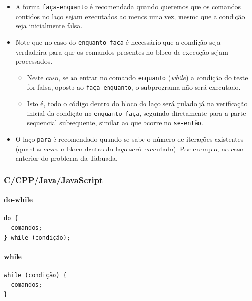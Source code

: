 \documentclass[12pt,a4paper]{article}
\begin{document}
    \begin{itemize}
\item
  A forma \texttt{faça-enquanto} é recomendada quando queremos que os
  comandos contidos no laço sejam executados ao menos uma vez, mesmo que
  a condição seja inicialmente falsa.
\item
  Note que no caso do \texttt{enquanto-faça} é necessário que a condição
  seja verdadeira para que os comandos presentes no bloco de execução
  sejam processados.

  \begin{itemize}
  \item
    Neste caso, se ao entrar no comando \texttt{enquanto} (\emph{while})
    a condição do teste for falsa, oposto ao \texttt{faça-enquanto}, o
    subprograma não será executado.
  \item
    Isto é, todo o código dentro do bloco do laço será pulado já na
    verificação inicial da condição no \texttt{enquanto-faça}, seguindo
    diretamente para a parte sequencial subsequente, similar ao que
    ocorre no \texttt{se-então}.
  \end{itemize}
\item
  O laço \texttt{para} é recomendado quando se sabe o número de
  iterações existentes (quantas vezes o bloco dentro do laço será
  executado). Por exemplo, no caso anterior do problema da Tabuada.
\end{itemize}

    \hypertarget{ccppjavajavascript}{%
\subsubsection{C/CPP/Java/JavaScript}\label{ccppjavajavascript}}

    \hypertarget{do-while}{%
\paragraph{do-while}\label{do-while}}

    \begin{verbatim}
do {
  comandos;
} while (condição);
\end{verbatim}

    \hypertarget{while}{%
\paragraph{while}\label{while}}

    \begin{verbatim}
while (condição) {
  comandos;
}
\end{verbatim}
\end{document}
